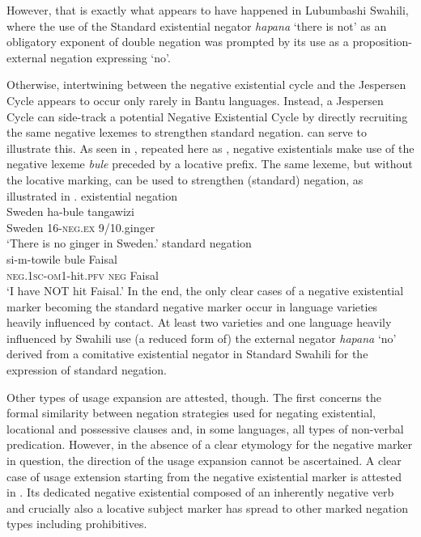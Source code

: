 \documentclass[output=paper]{langsci/langscibook}
\begin{document}
However, that is exactly what appears to have happened in
Lubumbashi Swahili, where the use of the Standard  existential negator \textit{hapana} `there is not' as an obligatory exponent of double negation was prompted by its use as a proposition-external negation
expressing `no'.

Otherwise, intertwining between the negative existential cycle and the Jespersen Cycle appears to occur only rarely in Bantu languages. Instead, a Jespersen Cycle can side-track a potential Negative Existential Cycle by directly recruiting the same negative lexemes to strengthen standard negation.  can serve to illustrate this. As seen in , repeated here as , negative existentials make use of the negative lexeme \textit{bule} preceded by a locative prefix. The same lexeme, but without the locative marking, can be used to strengthen (standard) negation, as illustrated in .
%
\ea\label{ex:kami-ginger-Faisal}
%
\ea\label{ex:kami-ginger} existential negation\\
\gll Sweden ha-bule tangawizi\\
	Sweden 16-\textsc{neg.ex} 9/10.ginger\\
\glt `There is no ginger in Sweden.'
%
\ex\label{ex:kami-Faisal} standard negation\\
\gll si-m-towile bule Faisal\\
	\textsc{neg.1sc}-\textsc{om}1-hit.\textsc{pfv} \textsc{neg} Faisal\\
\glt `I have NOT hit Faisal.'
\z\z
%
In the end, the only clear cases of a negative existential marker becoming
the standard negative marker occur in language varieties heavily influenced
by contact. At least two  varieties and one language heavily
influenced by Swahili use (a reduced form of) the external negator
\textit{hapana} `no' derived from a comitative existential negator in
Standard Swahili for the expression of standard negation.

Other types of usage expansion are attested, though. The first concerns the formal similarity between negation strategies used for negating existential, locational and possessive clauses and, in some languages, all types of non-verbal predication. However, in the absence of a clear etymology for the negative marker in question, the direction of the usage expansion cannot be ascertained. A clear case of usage extension starting from the negative existential marker is attested in . Its dedicated negative existential composed of an inherently negative verb and crucially also a locative subject marker has spread to other marked negation types including prohibitives.
\end{document}
